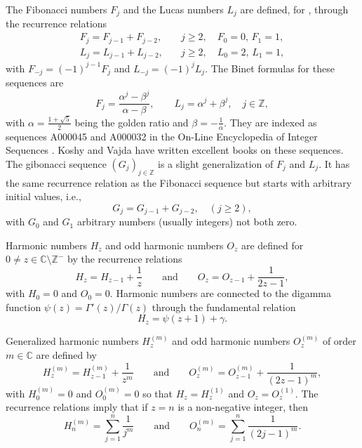 \documentclass[12pt,reqno]{article}
\begin{document}
	The Fibonacci numbers $F_j$ and the Lucas numbers $L_j$ are defined, for , through the recurrence relations
	\begin{align*}
		F_j = F_{j-1}+F_{j-2},& \quad j\geq 2,\quad F_0=0,\, F_1=1,\\
		L_j = L_{j-1}+L_{j-2},& \quad  j\geq 2, \quad L_0=2, \, L_1=1,
	\end{align*}
	with $F_{-j} = (-1)^{j-1}F_j$ and $L_{-j} = (-1)^j L_j$. The Binet formulas for these sequences are
	\begin{equation}\label{Binet}
		F_j = \frac{\alpha^j - \beta^j}{\alpha - \beta}, \qquad L_j = \alpha^j + \beta^j, \quad j\in\mathbb Z,
	\end{equation}
	with $\alpha=\frac{1+\sqrt 5}2$ being the golden ratio and $\beta=-\frac{1}{\alpha}$.
	They are indexed as sequences {A000045} and {A000032} in the On-Line Encyclopedia of Integer Sequences \cite{OEIS}.
	Koshy \cite{Koshy} and Vajda \cite{Vajda} have written excellent books on these sequences. The gibonacci sequence
	$(G_j)_{j\in\mathbb Z}$ is a slight generalization of $F_j$ and $L_j$. It has the same recurrence relation as the Fibonacci sequence
	but starts with arbitrary initial values, i.e.,
	\begin{equation*}
		G_j  = G_{j - 1} + G_{j - 2},\quad (j \ge 2),
	\end{equation*}
	with $G_0$ and $G_1$ arbitrary numbers (usually integers) not both zero.
	
	Harmonic numbers $H_z$ and odd harmonic numbers $O_z$ are defined
	for $0\ne z\in\mathbb C\setminus\mathbb Z^{-}$ by the recurrence relations
	\begin{equation*}
		H_z = H_{z - 1} + \frac{1}{z} \qquad \text{and} \qquad O_z = O_{z - 1} + \frac{1}{2z - 1},
	\end{equation*}
	with $H_0=0$ and $O_0=0$. Harmonic numbers are connected to the digamma function $\psi(z)=\Gamma'(z)/\Gamma(z)$ through the fundamental relation
	\begin{equation}\label{Harm_psi}
		H_z = \psi(z + 1) + \gamma.
	\end{equation}
	
	Generalized harmonic numbers $H_z^{(m)}$ and odd harmonic numbers $O_z^{(m)}$ of order $m\in\mathbb C$ are defined by
	\begin{equation*}
		H_z^{(m)} = H_{z - 1}^{(m)} + \frac{1}{z^m} \qquad \text{and} \qquad
		O_z^{(m)} = O_{z - 1}^{(m)} + \frac{1}{(2z - 1)^m},
	\end{equation*}
	with $H_0^{(m)}=0$ and $O_0^{(m)}=0$ so that $H_z=H_z^{(1)}$ and $O_z=O_z^{(1)}$. The recurrence relations imply
	that if $z=n$ is a non-negative integer, then
	\begin{equation*}
		H_n^{(m)} = \sum_{j = 1}^n \frac{1}{j^m} \qquad \text{and} \qquad O_n^{(m)} = \sum_{j = 1}^n \frac{1}{(2j - 1)^m}.
	\end{equation*}
	
\end{document}
